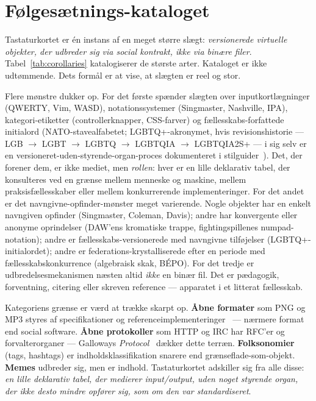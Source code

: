 \documentclass[10pt,letterpaper,twocolumn]{article}
\begin{document}
\section{Følgesætnings-kataloget}
\label{sec:corollaries}

Tastaturkortet er én instans af en meget større slægt: \emph{versionerede virtuelle objekter, der udbreder sig via social kontrakt, ikke via binære filer}. Tabel~\ref{tab:corollaries} katalogiserer de største arter. Kataloget er ikke udtømmende. Dets formål er at vise, at slægten er reel og stor.


Flere mønstre dukker op. For det første spænder slægten over inputkortlægninger (QWERTY, Vim, WASD), notationssystemer (Singmaster, Nashville, IPA), kategori-etiketter (controllerknapper, CSS-farver) og fællesskabs-forfattede initialord (NATO-stavealfabetet; LGBTQ+-akronymet, hvis revisionshistorie --- LGB $\rightarrow$ LGBT $\rightarrow$ LGBTQ $\rightarrow$ LGBTQIA $\rightarrow$ LGBTQIA2S+ --- i sig selv er en versioneret-uden-styrende-organ-proces dokumenteret i stilguider~\citep{glaad_reference_guide}). Det, der forener dem, er ikke mediet, men \emph{rollen}: hver er en lille deklarativ tabel, der konsulteres ved en grænse mellem menneske og maskine, mellem praksisfællesskaber eller mellem konkurrerende implementeringer. For det andet er det navngivne-opfinder-mønster meget varierende. Nogle objekter har en enkelt navngiven opfinder (Singmaster, Coleman, Davis); andre har konvergente eller anonyme oprindelser (DAW'ens kromatiske trappe, fightingspillenes numpad-notation); andre er fællesskabs-versionerede med navngivne tilføjelser (LGBTQ+-initialordet); andre er federations-krystalliserede efter en periode med fællesskabskonkurrence (algebraisk skak, BÉPO). For det tredje er udbredelsesmekanismen næsten altid \emph{ikke} en binær fil. Det er pædagogik, forventning, citering eller skreven reference --- apparatet i et litterat fællesskab.

Kategoriens grænse er værd at trække skarpt op. \textbf{Åbne formater} som PNG og MP3 styres af specifikationer og referenceimplementeringer~\citep{sterne2012mp3} --- nærmere format end social software. \textbf{Åbne protokoller} som HTTP og IRC har RFC'er og forvalterorganer --- Galloways \emph{Protocol}~\citep{galloway2004protocol} dækker dette terræn. \textbf{Folksonomier} (tags, hashtags) er indholdsklassifikation snarere end grænseflade-som-objekt. \textbf{Memes} udbreder sig, men er indhold. Tastaturkortet adskiller sig fra alle disse: \emph{en lille deklarativ tabel, der medierer input/output, uden noget styrende organ, der ikke desto mindre opfører sig, som om den var standardiseret}.
\end{document}
